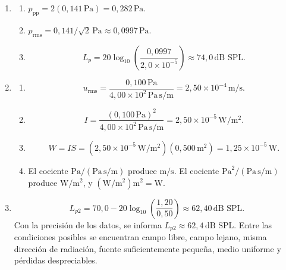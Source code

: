 \begin{enumerate}[label=\textbf{G\arabic*.},leftmargin=*]
    \item
    \begin{enumerate}[label=\alph*)]
        \item \(p_\mathrm{pp}=2(0{,}141\,\text{Pa})
        =0{,}282\,\text{Pa}\).
        \item \(p_\mathrm{rms}
        =0{,}141/\sqrt{2}\,\text{Pa}
        \approx0{,}0997\,\text{Pa}\).
        \item
        \[
            L_p
              =20\log_{10}\!\left(
               \frac{0{,}0997}
                    {2{,}0\times10^{-5}}\right)
              \approx74{,}0\,\text{dB SPL}.
        \]
    \end{enumerate}

    \item
    \begin{enumerate}[label=\alph*)]
        \item
        \[
            u_\mathrm{rms}
              =\frac{0{,}100\,\text{Pa}}
                     {4{,}00\times10^2\,
                      \text{Pa}\,\text{s}/\text{m}}
              =2{,}50\times10^{-4}\,\text{m}/\text{s}.
        \]
        \item
        \[
            I=\frac{(0{,}100\,\text{Pa})^2}
                    {4{,}00\times10^2\,
                     \text{Pa}\,\text{s}/\text{m}}
             =2{,}50\times10^{-5}\,\text{W}/\text{m}^2.
        \]
        \item
        \[
            W=IS
             =(2{,}50\times10^{-5}\,\text{W}/\text{m}^2)
              (0{,}500\,\text{m}^2)
             =1{,}25\times10^{-5}\,\text{W}.
        \]
        \item El cociente
        \(\text{Pa}/(\text{Pa}\,\text{s}/\text{m})\) produce
        \(\text{m}/\text{s}\). El cociente
        \(\text{Pa}^2/(\text{Pa}\,\text{s}/\text{m})\) produce
        \(\text{W}/\text{m}^2\), y
        \((\text{W}/\text{m}^2)\text{m}^2=\text{W}\).
    \end{enumerate}

    \item
    \[
        L_{p2}
          =70{,}0-20\log_{10}\!\left(
             \frac{1{,}20}{0{,}50}\right)
          \approx62{,}40\,\text{dB SPL}.
    \]
    Con la precisión de los datos, se informa
    \(L_{p2}\approx62{,}4\,\text{dB SPL}\).
    Entre las condiciones posibles se encuentran campo libre, campo lejano,
    misma dirección de radiación, fuente suficientemente pequeña, medio
    uniforme y pérdidas despreciables.
\end{enumerate}

